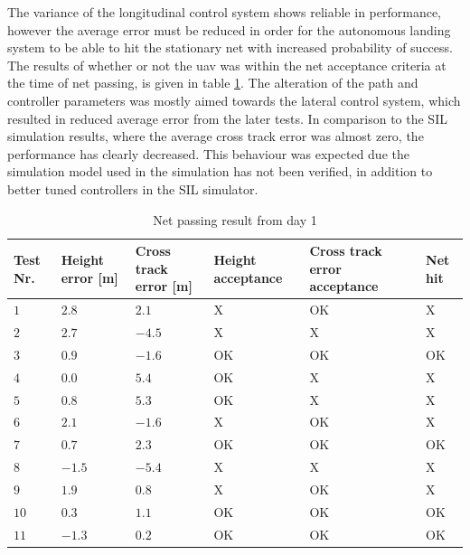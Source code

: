 The variance of the longitudinal control system shows reliable in performance, however the average error must be reduced in order for the autonomous landing system to be able to hit the stationary net with increased probability of success. The results of whether or not the \gls{uav} was within the net acceptance criteria at the time of net passing, is given in table \ref{tb:Day1LandingAttempt}. The alteration of the path and controller parameters was mostly aimed towards the lateral control system, which resulted in reduced average error from the later tests. In comparison to the SIL simulation results, where the average cross track error was almost zero, the performance has clearly decreased. This behaviour was expected due the simulation model used in the simulation has not been verified, in addition to better tuned controllers in the SIL simulator.
\begin{table}[H]
\centering
\begin{tabular}{| p{0.5cm} | p{1cm} | p{1cm} | p{3.5cm} | p{3cm} | p{1cm} |}
\hline
\textbf{Test Nr.}	& \textbf{Height error [m]}	& \textbf{Cross track error [m]}& \textbf{Height acceptance}& \textbf{Cross track error acceptance}	& \textbf{Net hit}\\ \hline
$1$				& $2.8$		& $2.1$		& X								& OK									& X					\\ \hline
$2$				& $2.7$		& $-4.5$	& X								& X										& X					\\ \hline
$3$				& $0.9$		& $-1.6$	& OK							& OK									& OK				\\ \hline
$4$				& $0.0$		& $5.4$		& OK							& X										& X					\\ \hline
$5$				& $0.8$		& $5.3$		& OK							& X										& X					\\ \hline
$6$				& $2.1$		& $-1.6$	& X								& OK									& X					\\ \hline
$7$				& $0.7$		& $2.3$		& OK							& OK									& OK				\\ \hline
$8$				& $-1.5$	& $-5.4$	& X								& X										& X					\\ \hline
$9$				& $1.9$		& $0.8$		& X								& OK									& X					\\ \hline
$10$			& $0.3$	& $1.1$		& OK							& OK									& OK				\\ \hline
$11$			& $-1.3$	& $0.2$		& OK							& OK									& OK				\\ \hline
\end{tabular}
\caption{Net passing result from day 1}
\label{tb:Day1LandingAttempt}
\end{table}
